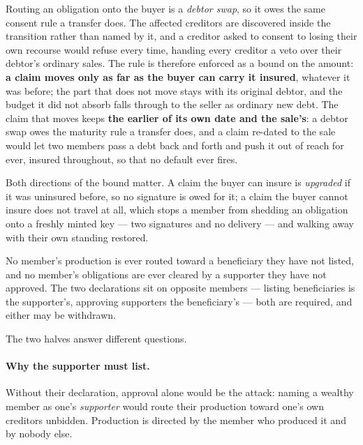 \begin{property}
\label{prop:no-downgrade}
Routing an obligation onto the buyer is a \emph{debtor swap}, so it owes the same consent
rule a transfer does. The affected creditors are discovered inside the transition rather
than named by it, and a creditor asked to consent to losing their own recourse would
refuse every time, handing every creditor a veto over their debtor's ordinary sales. The
rule is therefore enforced as a bound on the amount: \textbf{a claim moves only as far as
the buyer can carry it insured}, whatever it was before; the part that does not move stays
with its original debtor, and the budget it did not absorb falls through to the seller as
ordinary new debt. The claim that moves keeps \textbf{the earlier of its own date and the
sale's}: a debtor swap owes the maturity rule a transfer does, and a claim re-dated to the
sale would let two members pass a debt back and forth and push it out of reach for ever,
insured throughout, so that no default ever fires.
\end{property}

Both directions of the bound matter. A claim the buyer can insure is \emph{upgraded} if it
was uninsured before, so no signature is owed for it; a claim the buyer cannot insure does
not travel at all, which stops a member from shedding an obligation onto a freshly minted
key --- two signatures and no delivery --- and walking away with their own standing
restored.

\begin{property}
\label{prop:benef}
No member's production is ever routed toward a beneficiary they have not listed, and no
member's obligations are ever cleared by a supporter they have not approved. The two
declarations sit on opposite members --- listing beneficiaries is the supporter's,
approving supporters the beneficiary's --- both are required, and either may be withdrawn.
\end{property}

The two halves answer different questions.

\paragraph{Why the supporter must list.} Without their declaration, approval alone would
be the attack: naming a wealthy member as one's \emph{supporter} would route their
production toward one's own creditors unbidden. Production is directed by the member who
produced it and by nobody else.

